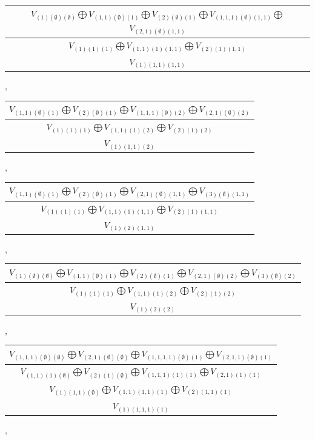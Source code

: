\documentclass[letterpaper,11pt]{article}
\begin{document}
	\newline 
	\begin{tabular}{| c |}
		\hline
		$V_{(1)(\emptyset)(\emptyset)}$$\bigoplus$$V_{(1,1)(\emptyset)(1)}$$\bigoplus$$V_{(2)(\emptyset)(1)}$$\bigoplus$$V_{(1,1,1)(\emptyset)(1,1)}$$\bigoplus$$V_{(2,1)(\emptyset)(1,1)}$\\
		\hline
		$V_{(1)(1)(1)}$$\bigoplus$$V_{(1,1)(1)(1,1)}$$\bigoplus$$V_{(2)(1)(1,1)}$\\
		\hline
		$V_{(1)(1,1)(1,1)}$\\
		\hline
	\end{tabular}, 
	\newline 
	\begin{tabular}{| c |}
		\hline
		$V_{(1,1)(\emptyset)(1)}$$\bigoplus$$V_{(2)(\emptyset)(1)}$$\bigoplus$$V_{(1,1,1)(\emptyset)(2)}$$\bigoplus$$V_{(2,1)(\emptyset)(2)}$\\
		\hline
		$V_{(1)(1)(1)}$$\bigoplus$$V_{(1,1)(1)(2)}$$\bigoplus$$V_{(2)(1)(2)}$\\
		\hline
		$V_{(1)(1,1)(2)}$\\
		\hline
	\end{tabular}, 
	\begin{tabular}{| c |}
		\hline
		$V_{(1,1)(\emptyset)(1)}$$\bigoplus$$V_{(2)(\emptyset)(1)}$$\bigoplus$$V_{(2,1)(\emptyset)(1,1)}$$\bigoplus$$V_{(3)(\emptyset)(1,1)}$\\
		\hline
		$V_{(1)(1)(1)}$$\bigoplus$$V_{(1,1)(1)(1,1)}$$\bigoplus$$V_{(2)(1)(1,1)}$\\
		\hline
		$V_{(1)(2)(1,1)}$\\
		\hline
	\end{tabular}, 
	\newline 
	\begin{tabular}{| c |}
		\hline
		$V_{(1)(\emptyset)(\emptyset)}$$\bigoplus$$V_{(1,1)(\emptyset)(1)}$$\bigoplus$$V_{(2)(\emptyset)(1)}$$\bigoplus$$V_{(2,1)(\emptyset)(2)}$$\bigoplus$$V_{(3)(\emptyset)(2)}$\\
		\hline
		$V_{(1)(1)(1)}$$\bigoplus$$V_{(1,1)(1)(2)}$$\bigoplus$$V_{(2)(1)(2)}$\\
		\hline
		$V_{(1)(2)(2)}$\\
		\hline
	\end{tabular}, 
	\newline 
	\begin{tabular}{| c |}
		\hline
		$V_{(1,1,1)(\emptyset)(\emptyset)}$$\bigoplus$$V_{(2,1)(\emptyset)(\emptyset)}$$\bigoplus$$V_{(1,1,1,1)(\emptyset)(1)}$$\bigoplus$$V_{(2,1,1)(\emptyset)(1)}$\\
		\hline
		$V_{(1,1)(1)(\emptyset)}$$\bigoplus$$V_{(2)(1)(\emptyset)}$$\bigoplus$$V_{(1,1,1)(1)(1)}$$\bigoplus$$V_{(2,1)(1)(1)}$\\
		\hline
		$V_{(1)(1,1)(\emptyset)}$$\bigoplus$$V_{(1,1)(1,1)(1)}$$\bigoplus$$V_{(2)(1,1)(1)}$\\
		\hline
		$V_{(1)(1,1,1)(1)}$\\
		\hline
	\end{tabular}, 
\end{document}

